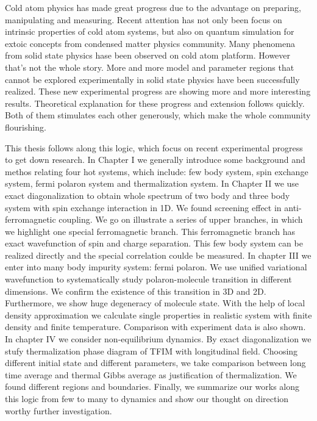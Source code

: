 Cold atom physics has made great progress due to the advantage on preparing, manipulating and measuring. Recent attention has not only been focus on intrinsic properties of cold atom systems, but also on quantum simulation for extoic concepts from condensed matter physics community. Many phenomena from solid state physics hase been observed on cold atom platform. However that's not the whole story. More and more model and parameter regions that cannot be explored experimentally in solid state physics have been successfully realized. These new experimental progress are showing more and more interesting results. Theoretical explanation for these progress and extension follows quickly. Both of them stimulates each other generously, which make the whole community flourishing.

This thesis follows along this logic, which focus on recent experimental progress to get down research. In Chapter I we generally introduce some background and methos relating four hot systems, which include: few body system, spin exchange system, fermi polaron system and thermalization system. In Chapter II we use exact diagonalization to obtain whole spectrum of two body and three body system with spin exchange interaction in 1D. We found screening effect in anti-ferromagnetic coupling. We go on illustrate a series of upper branches, in which we highlight one special ferromagnetic branch. This ferromagnetic branch has exact wavefunction of spin and charge separation. This few body system can be realized directly and the special correlation coulde be measured. In chapter III we enter into many body impurity system: fermi polaron. We use unified variational wavefunction to systematically study polaron-molecule transition in different dimensions. We confirm the existence of this transition in 3D and 2D. Furthermore, we show huge degeneracy of molecule state. With the help of local density approximation we calculate single properties in realistic system with finite density and finite temperature. Comparison with experiment data is also shown. In chapter IV we consider non-equilibrium dynamics. By exact diagonalization we stufy thermalization phase diagram of TFIM with longitudinal field. Choosing different initial state and different parameters, we take comparison between long time average and thermal Gibbs average as justification of thermalization. We found different regions and boundaries. Finally, we summarize our works along this logic from few to many to dynamics and show our thought on direction worthy further investigation.

